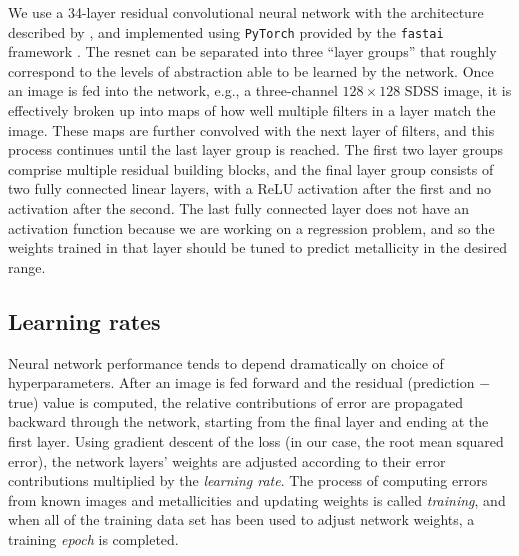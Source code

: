 \documentclass[fleqn,usenatbib]{mnras}
\begin{document}
We use a 34-layer residual convolutional neural network with the architecture described by \cite{He2015}, and implemented using \texttt{PyTorch} \citep[version 0.3.1;][]{pytorch} provided by the \texttt{fastai} framework \citep[version 0.7;][]{fastai}.
The resnet can be separated into three ``layer groups'' that roughly correspond to the levels of abstraction able to be learned by the network.
Once an image is fed into the network, e.g., a three-channel $128\times 128$ SDSS image, it is effectively broken up into maps of how well multiple filters in a layer match the image.
These maps are further convolved with the next layer of filters, and this process continues until the last layer group is reached.
The first two layer groups comprise multiple residual building blocks, and the final layer group consists of two fully connected linear layers, with a ReLU activation after the first and no activation after the second.
The last fully connected layer does not have an activation function because we are working on a regression problem, and so the weights trained in that layer should be tuned to predict metallicity in the desired range.



\subsection{Learning rates}

Neural network performance tends to depend dramatically on choice of hyperparameters.
After an image is fed forward and the residual (prediction $-$ true) value is computed, the relative contributions of error are propagated backward through the network, starting from the final layer and ending at the first layer.
Using gradient descent of the loss (in our case, the root mean squared error), the network layers' weights are adjusted according to their error contributions multiplied by the \textit{learning rate}.
The process of computing errors from known images and metallicities and updating weights is called \textit{training}, and when all of the training data set has been used to adjust network weights, a training \textit{epoch} is completed.
\end{document}
